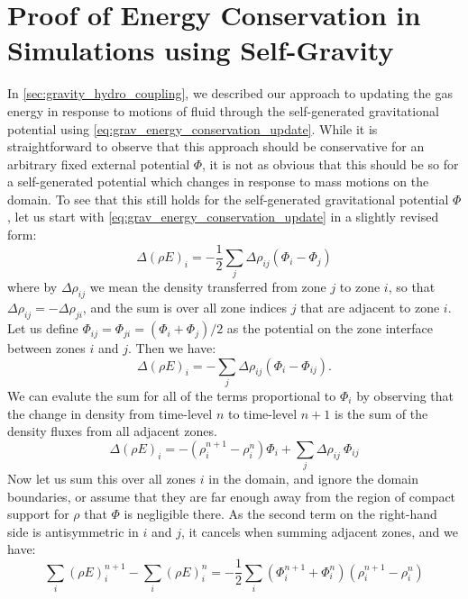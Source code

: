 \documentclass[iop]{../emulateapj}
\begin{document}
\section{Proof of Energy Conservation in Simulations using Self-Gravity}
\label{app:gravity}

In \autoref{sec:gravity_hydro_coupling}, we described our approach to updating the gas energy
in response to motions of fluid through the self-generated gravitational potential using 
\autoref{eq:grav_energy_conservation_update}. While it is straightforward to observe that this approach
should be conservative for an arbitrary fixed external potential $\Phi$, it is not as obvious that this
should be so for a self-generated potential which changes in response to mass motions on the domain. To
see that this still holds for the self-generated gravitational potential $\Phi$, let us start with 
\autoref{eq:grav_energy_conservation_update} in a slightly revised form:
\begin{equation}
  \Delta(\rho E)_i = -\frac{1}{2}\sum_{j} \Delta\rho_{ij}(\Phi_i - \Phi_{j}) \label{eq:grav_energy_conservation_update_revised}
\end{equation}
where by $\Delta \rho_{ij}$ we mean the density transferred from zone $j$ to zone $i$, so that
$\Delta \rho_{ij} = - \Delta \rho_{ji}$, and the sum is over all zone indices $j$ that are adjacent
to zone $i$. Let us define $\Phi_{ij} = \Phi_{ji} = (\Phi_{i} + \Phi_{j}) / 2$ as the potential on the
zone interface between zones $i$ and $j$. Then we have:
\begin{equation}
  \Delta(\rho E)_i = -\sum_{j} \Delta\rho_{ij}(\Phi_i - \Phi_{ij}).
\end{equation}
We can evalute the sum for all of the terms proportional to $\Phi_i$ by observing that the change in
density from time-level $n$ to time-level $n+1$ is the sum of the density fluxes from all adjacent zones.
\begin{equation*}
  \Delta(\rho E)_i = - (\rho_i^{n+1} - \rho_i^{n}) \Phi_i + \sum_{j}\Delta \rho_{ij} \ \Phi_{ij}
\end{equation*}
Now let us sum this over all zones $i$ in the domain, and ignore the domain boundaries, or assume that they are
far enough away from the region of compact support for $\rho$ that $\Phi$ is negligible there. As the second
term on the right-hand side is antisymmetric in $i$ and $j$, it cancels when summing adjacent zones, and we have:
\begin{equation*}
  \sum_{i} (\rho E)_i^{n+1} - \sum_{i} (\rho E)_i^{n} = -\frac{1}{2}\sum_{i} (\Phi_{i}^{n+1} + \Phi_{i}^{n})(\rho_i^{n+1} - \rho_i^{n})
\end{equation*}
\end{document}
